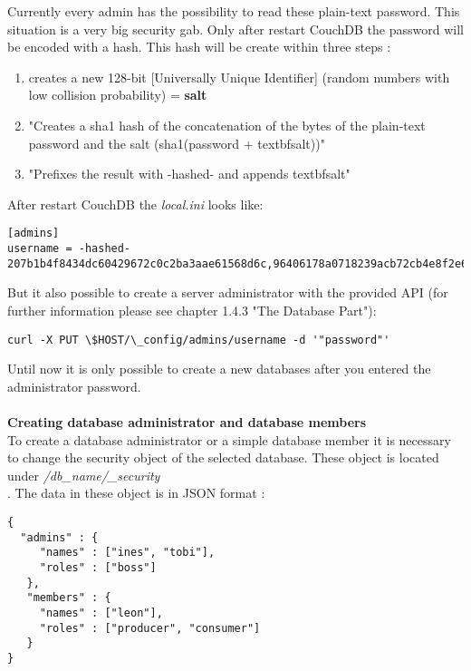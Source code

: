 Currently every admin has the possibility to read these plain-text password. This situation is a very big security gab. Only after restart CouchDB the password will be encoded with a hash. This hash will be create within three steps \cite{Anderson.2010.Buch}:
\begin{enumerate}
\item creates a new 128-bit [Universally Unique Identifier] (random numbers with low collision probability) = \textbf{salt} \cite{Anderson.2010.Buch}
\item "Creates a sha1 hash of the concatenation of the bytes of the plain-text password and the salt (sha1(password + textbf{salt}))" \\ \cite{Anderson.2010.Buch}
\item "Prefixes the result with -hashed- and appends textbf{salt}" \\ \cite{Anderson.2010.Buch}
\end{enumerate}
After restart CouchDB the \textit{local.ini} looks like:
\begin{lstlisting}[frame=single, caption=Example Create new Server Administrator with local.ini File \protect\cite{ApacheSoftwareFoundation.2013.AdminAccount}]
[admins]
username = -hashed-207b1b4f8434dc60429672c0c2ba3aae61568d6c,96406178a0718239acb72cb4e8f2e66e
\end{lstlisting}
But it also possible to create a server administrator with the provided API (for further information please see chapter 1.4.3 "The Database Part"): \\ \cite{Anderson.2010.Buch}
\begin{lstlisting}[frame=single, caption=Example Create new Server Administrator with REST API \protect\cite{Anderson.2010.Buch}]
curl -X PUT \$HOST/\_config/admins/username -d '"password"'
\end{lstlisting} 

Until now it is only possible to create a new databases after you entered the administrator password. \\
\\
\textbf{Creating database administrator and database members}
\\
To create a database administrator or a simple database member it is necessary to change the security object of the selected database. These object is located under \textit{\slash db\_name\slash\_security} \\ \cite{ApacheSoftwareFoundation.2013.SecurityFeatures}.
The data in these object is in JSON format \cite{ApacheSoftwareFoundation.2013.SecurityFeatures}:
\begin{lstlisting}[frame=single, caption=Example Create new Database Members and Database Administrator \protect\cite{ApacheSoftwareFoundation.2013.SecurityFeatures}]
{
  "admins" : {
     "names" : ["ines", "tobi"],
     "roles" : ["boss"]
   },
   "members" : {
     "names" : ["leon"],
     "roles" : ["producer", "consumer"]
   }
}
\end{lstlisting}

